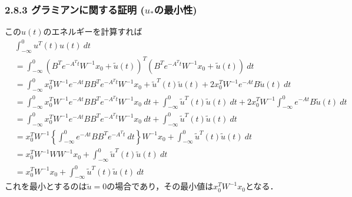 \begin{frame}[t]
\frametitle{2.8.3 グラミアンに関する証明 ($u_*$の最小性)}

\footnotesize
この$u(t)$のエネルギーを計算すれば
\begin{align}
	&\int_{-\infty}^{0} u^T(t) u(t) \ dt
\nonumber \\
	&= \int_{-\infty}^{0} 
		(B^T e^{-A^T t} W^{-1} x_0 + \tilde{u}(t))^T 
		(B^T e^{-A^T t} W^{-1} x_0 + \tilde{u}(t)) \ dt
\nonumber \\
	&= \int_{-\infty}^{0} 
		x_0^T W^{-1} e^{-A t} B B^T e^{-A^T t} W^{-1} x_0
		+ \tilde{u}^T(t) \tilde{u}(t) 
		+ 2 x_0^T W^{-1} e^{-A t} B \tilde{u}(t) \ dt
\nonumber \\
	&= \int_{-\infty}^{0} 
		x_0^T W^{-1} e^{-A t} B B^T e^{-A^T t} W^{-1} x_0 \ dt
		+ \int_{-\infty}^{0} \tilde{u}^T(t) \tilde{u}(t) \ dt
		+ 2 x_0^T W^{-1} \int_{-\infty}^{0} e^{-A t} B \tilde{u}(t) \ dt
\nonumber \\
	&= \int_{-\infty}^{0} 
		x_0^T W^{-1} e^{-A t} B B^T e^{-A^T t} W^{-1} x_0 \ dt
		+ \int_{-\infty}^{0} \tilde{u}^T(t) \tilde{u}(t) \ dt
\nonumber \\
	&= x_0^T W^{-1} \left \{ \int_{-\infty}^{0} 
		 e^{-A t} B B^T e^{-A^T t} \ dt \right \} W^{-1} x_0 
		+ \int_{-\infty}^{0} \tilde{u}^T(t) \tilde{u}(t) \ dt
\nonumber \\
	&= x_0^T W^{-1} W W^{-1} x_0 
		+ \int_{-\infty}^{0} \tilde{u}^T(t) \tilde{u}(t) \ dt
\nonumber \\
	&= x_0^T W^{-1} x_0 
	   + \int_{-\infty}^{0} \tilde{u}^T(t) \tilde{u}(t) \ dt
\end{align}
これを最小とするのは$\tilde{u}=0$の場合であり，その最小値は$x_0^T W^{-1} x_0$となる．

\end{frame}

